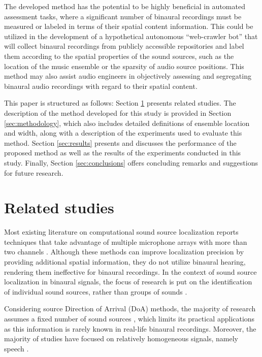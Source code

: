 \documentclass[11pt]{article}
\begin{document}
The developed method has the potential to be highly beneficial in automated assessment tasks, where a significant number of binaural recordings must be measured or labeled in terms of their spatial content information. This could be utilized in the development of a hypothetical autonomous ``web-crawler bot'' that will collect binaural recordings from publicly accessible repositories and label them according to the spatial properties of the sound sources, such as the location of the music ensemble or the sparsity of audio source positions. This method may also assist audio engineers in objectively assessing and segregating binaural audio recordings with regard to their spatial content.

This paper is structured as follows: Section \ref{sec:related-studies} presents related studies. The description of the method developed for this study is provided in Section \ref{sec:methodology}, which also includes detailed definitions of ensemble location and width, along with a description of the experiments used to evaluate this method. Section \ref{sec:results} presents and discusses the performance of the proposed method as well as the results of the experiments conducted in this study. Finally, Section \ref{sec:conclusions} offers concluding remarks and suggestions for future research.

\section{Related studies}
\label{sec:related-studies}

Most existing literature on computational sound source localization reports techniques that take advantage of multiple microphone arrays with more than two channels \parencite{kaveh_statistical_1986, pavlidi_real-time_2012, pan_multi-tone_2021, hahmann_sound_2022, chung_sound_2022, liu_sound_2022}. Although these methods can improve localization precision by providing additional spatial information, they do not utilize binaural hearing, rendering them ineffective for binaural recordings. In the context of sound source localization in binaural signals, the  focus of research is put on the identification of individual sound sources, rather than groups of sounds \parencite{dietz_auditory_2011, may_probabilistic_2011, may_binaural_2012, woodruff_binaural_2012, may_robust_2015, ma16c_interspeech, ma_exploiting_2017, benaroya_binaural_2018}.

Considering source Direction of Arrival (DoA) methods, the majority of research assumes a fixed number of sound sources \parencite{pang_multitask_2019, vera-diaz_towards_2018, ma_exploiting_2017, woodruff_binaural_2012, arthi_spatiogram_2021}, which limits its practical applications as this information is rarely known in real-life binaural recordings. Moreover, the majority of studies have focused on relatively homogeneous signals, namely speech \parencite{dietz_auditory_2011, may_probabilistic_2011, may_binaural_2012, woodruff_binaural_2012, may_robust_2015, ma16c_interspeech, ma_exploiting_2017, benaroya_binaural_2018, wang_binaural_2020, liu_multiple_2018, yang_deepear_2022, ma_robust_2018}.
\end{document}
